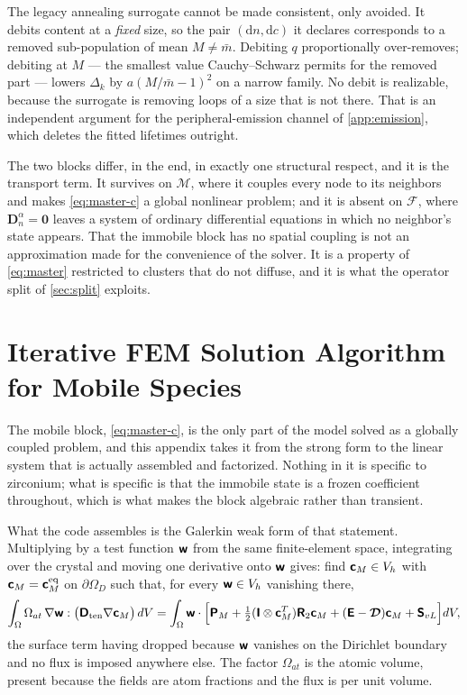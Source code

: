 The legacy annealing surrogate cannot be made consistent, only avoided.
It debits content at a \emph{fixed} size, so the pair $(\mathrm dn,\mathrm dc)$
it declares corresponds to a removed sub-population of mean $M\ne\bar m$.
Debiting $q$ proportionally over-removes; debiting at $M$ --- the smallest value
Cauchy--Schwarz permits for the removed part --- lowers $\Delta_k$ by
$a(M/\bar m-1)^{2}$ on a narrow family. No debit is realizable, because the
surrogate is removing loops of a size that is not there. That is an independent
argument for the peripheral-emission channel of \cref{app:emission}, which
deletes the fitted lifetimes outright.

The two blocks differ, in the end, in exactly one structural respect, and it is
the transport term. It survives on $\mathcal M$, where it couples every node to
its neighbors and makes \cref{eq:master-c} a global nonlinear problem; and
it is absent on $\mathcal F$, where $\bm D^\alpha_n=\bm0$ leaves a system of
ordinary differential equations in which no neighbor's state appears. That the
immobile block has no spatial coupling is not an approximation made for the
convenience of the solver. It is a property of \cref{eq:master} restricted to
clusters that do not diffuse, and it is what the operator split of
\cref{sec:split} exploits.

\section{Iterative FEM Solution Algorithm for Mobile Species}
\label{app:fem}

The mobile block, \cref{eq:master-c}, is the only part of the model solved
as a globally coupled problem, and this appendix takes it from the strong form
to the linear system that is actually assembled and factorized. Nothing in it
is specific to zirconium; what is specific is that the immobile state is a
frozen coefficient throughout, which is what makes the block algebraic rather
than transient.

What the code assembles is the Galerkin weak form of that statement.
Multiplying by a test function $\bm{\mathsf{w}}$ from the same finite-element space,
integrating over the crystal and moving one derivative onto $\bm{\mathsf{w}}$ gives:
find $\bm{\mathsf{c}}_M\in V_h$ with $\bm{\mathsf{c}}_M=\bm{\mathsf{c}}_M^{\mathrm{eq}}$ on
$\partial\Omega_D$ such that, for every $\bm{\mathsf{w}}\in V_h$ vanishing there,
\[
  \int_\Omega \Omega_{at}\,\nabla\bm{\mathsf{w}}:\bigl(\bm{\mathsf{D}}_{\mathrm{ten}}
      \nabla\bm{\mathsf{c}}_M\bigr)\,dV
  =\int_\Omega \bm{\mathsf{w}}\cdot\Bigl[\bm{\mathsf{P}}_M
    +\tfrac12(\bm{\mathsf{I}}\otimes\bm{\mathsf{c}}_M^{T})\bm{\mathsf{R}}_2\bm{\mathsf{c}}_M
    +(\bm{\mathsf{E}}-\bm{\mathcal{D}})\bm{\mathsf{c}}_M+\bm{\mathsf{S}}_{vL}\Bigr]dV ,
\]
the surface term having dropped because $\bm{\mathsf{w}}$ vanishes on the Dirichlet
boundary and no flux is imposed anywhere else. The factor $\Omega_{at}$ is the
atomic volume, present because the fields are atom fractions and the flux is
per unit volume.

